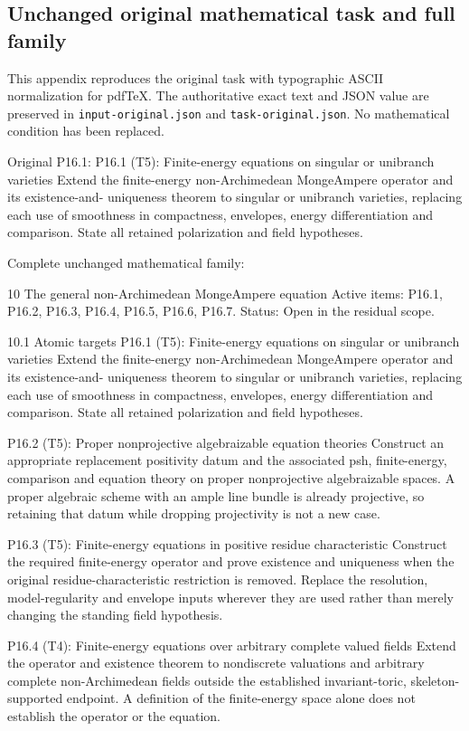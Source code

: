 \documentclass[
  10pt,
]{article}
\begin{document}
\subsection{Unchanged original mathematical task and full
family}\label{unchanged-original-mathematical-task-and-full-family}

This appendix reproduces the original task with typographic ASCII
normalization for pdfTeX. The authoritative exact text and JSON value
are preserved in \texttt{input-original.json} and
\texttt{task-original.json}. No mathematical condition has been
replaced.

Original P16.1: P16.1 (T5): Finite-energy equations on singular or
unibranch varieties Extend the finite-energy non-Archimedean MongeAmpere
operator and its existence-and- uniqueness theorem to singular or
unibranch varieties, replacing each use of smoothness in compactness,
envelopes, energy differentiation and comparison. State all retained
polarization and field hypotheses.

Complete unchanged mathematical family:

10 The general non-Archimedean MongeAmpere equation Active items: P16.1,
P16.2, P16.3, P16.4, P16.5, P16.6, P16.7. Status: Open in the residual
scope.

10.1 Atomic targets P16.1 (T5): Finite-energy equations on singular or
unibranch varieties Extend the finite-energy non-Archimedean MongeAmpere
operator and its existence-and- uniqueness theorem to singular or
unibranch varieties, replacing each use of smoothness in compactness,
envelopes, energy differentiation and comparison. State all retained
polarization and field hypotheses.

P16.2 (T5): Proper nonprojective algebraizable equation theories
Construct an appropriate replacement positivity datum and the associated
psh, finite-energy, comparison and equation theory on proper
nonprojective algebraizable spaces. A proper algebraic scheme with an
ample line bundle is already projective, so retaining that datum while
dropping projectivity is not a new case.

P16.3 (T5): Finite-energy equations in positive residue characteristic
Construct the required finite-energy operator and prove existence and
uniqueness when the original residue-characteristic restriction is
removed. Replace the resolution, model-regularity and envelope inputs
wherever they are used rather than merely changing the standing field
hypothesis.

P16.4 (T4): Finite-energy equations over arbitrary complete valued
fields Extend the operator and existence theorem to nondiscrete
valuations and arbitrary complete non-Archimedean fields outside the
established invariant-toric, skeleton-supported endpoint. A definition
of the finite-energy space alone does not establish the operator or the
equation.
\end{document}
